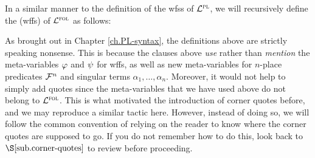 
In a similar manner to the definition of the wfss of $\mathcal{L}^{\textsc{pl}}$, we will recursively define the  (wffs) of $\mathcal{L}^{\textsc{fol}}$ as follows:


As brought out in Chapter \ref{ch.PL-syntax}, the definitions above are strictly speaking nonsense.
This is because the clauses above \textit{use} rather than \textit{mention} the meta-variables $\varphi$ and $\psi$ for wffs, as well as new meta-variables for $n$-place predicates $\mathcal{F}^n$ and singular terms $\alpha_1,\ldots,\alpha_n$.
Moreover, it would not help to simply add quotes since the meta-variables that we have used above do not belong to $\mathcal{L}^{\textsc{fol}}$.
This is what motivated the introduction of corner quotes before, and we may reproduce a similar tactic here.
However, instead of doing so, we will follow the common convention of relying on the reader to know where the corner quotes are supposed to go.
If you do not remember how to do this, look back to $\S\ref{sub.corner-quotes}$ to review before proceeding.

